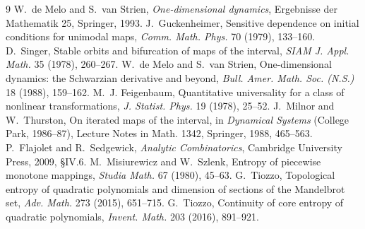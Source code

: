 \documentclass[11pt]{article}
\theoremstyle{plain}
\theoremstyle{definition}
\begin{document}
\begin{thebibliography}{9}\footnotesize\setlength{\itemsep}{1pt}\setlength{\parskip}{0pt}
 W.~de Melo and S.~van Strien, \emph{One-dimensional dynamics},
Ergebnisse der Mathematik 25, Springer, 1993.
 J.~Guckenheimer, Sensitive dependence on initial conditions for unimodal maps,
\emph{Comm. Math. Phys.} 70 (1979), 133--160.
 D.~Singer, Stable orbits and bifurcation of maps of the interval,
\emph{SIAM J. Appl. Math.} 35 (1978), 260--267.
 W.~de Melo and S.~van Strien, One-dimensional dynamics: the Schwarzian
derivative and beyond, \emph{Bull. Amer. Math. Soc. (N.S.)} 18 (1988), 159--162.
 M.~J. Feigenbaum, Quantitative universality for a class of nonlinear
transformations, \emph{J. Statist. Phys.} 19 (1978), 25--52.
 J.~Milnor and W.~Thurston, On iterated maps of the interval, in
\emph{Dynamical Systems} (College Park, 1986--87), Lecture Notes in Math. 1342,
Springer, 1988, 465--563.
 P.~Flajolet and R.~Sedgewick, \emph{Analytic Combinatorics},
Cambridge University Press, 2009, \S IV.6.
 M.~Misiurewicz and W.~Szlenk, Entropy of piecewise monotone mappings,
\emph{Studia Math.} 67 (1980), 45--63.
 G.~Tiozzo, Topological entropy of quadratic polynomials and dimension of
sections of the Mandelbrot set, \emph{Adv. Math.} 273 (2015), 651--715.
 G.~Tiozzo, Continuity of core entropy of quadratic polynomials,
\emph{Invent. Math.} 203 (2016), 891--921.
\end{thebibliography}
\end{document}

